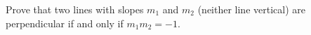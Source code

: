 Prove that two lines with slopes $m_1$ and $m_2$ (neither line vertical) are perpendicular if and only if $m_1m_2=-1$.
